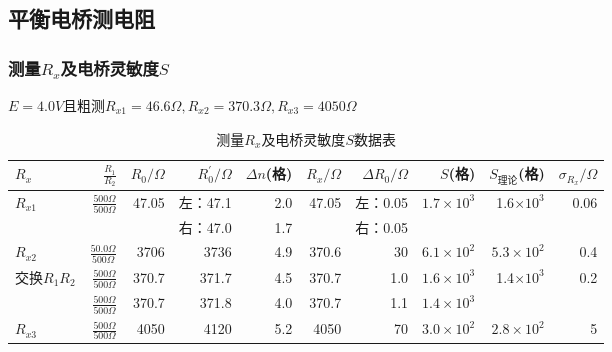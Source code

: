 \documentclass[a4 paper,12pt]{article}
\begin{document}
\subsection{平衡电桥测电阻}
\subsubsection{测量$R_{x}$及电桥灵敏度$S$}
\begin{center}
	$E=4.0V$且粗测$R_{x1}=46.6\Omega,R_{x2}=370.3\Omega,R_{x3}=4050\Omega$
\end{center}
\begin{table}[H]
	\centering
	\caption{测量$R_{x}$及电桥灵敏度$S$数据表}
	\begin{tabular}{|l|r|r|r|r|r|r|r|r|r|}
		\hline
		$R_{x} $   & $\frac{R_{1}}{R_{2}}$ & $R_{0}/\Omega$ &    $R_{0}^{\prime}/\Omega$   &$\Delta n$(格)       & $R_{x}/\Omega$      & $\Delta R_{0}/\Omega$      &  $S$(格)     &$S_{\text{理论}}$(格)& $\sigma_{R_{x}}/\Omega$ \\
		\hline \multirow{2}{*}{$R_{x1}$}&\multirow{2}{*}{$\frac{500\Omega}{500\Omega}$}&\multirow{2}{*}{47.05}&左：47.1&2.0&\multirow{2}{*}{47.05}&左：0.05&\multirow{2}{*}{$1.7\times10^{3}$}&\multirow{2}{*}{1.6$\times10^{3}$} &\multirow{2}{*}{0.06}\\
		&&&右：47.0&1.7&&右：0.05&&&\\
		\hline
		$R_{x2}$   &  $\frac{50.0\Omega}{500\Omega}$     & 3706  & 3736  & 4.9   & 370.6 & 30    & $6.1\times10^{2}$ &$5.3\times10^{2}$ &0.4 \\
		\hline
		\multirow{2}{*}{交换$R_{1}R_{2}$}  &   $\frac{500\Omega}{500\Omega}$    & 370.7 & 371.7 & 4.5   & 370.7 & 1.0     & $1.6\times10^{3}$ & \multirow{2}{*}{1.4$\times10^{3}$}& \multirow{2}{*}{0.2}\\
		 \cline{2-8} &  $\frac{500\Omega}{500\Omega}$     & 370.7 & 371.8 & 4.0  & 370.7 & 1.1   & $1.4\times10^{3}$ &&  \\
		  \hline
	 $R_{x3}$   &  $\frac{500\Omega}{500\Omega}$     & 4050  & 4120  & 5.2   & 4050  & 70    &  $3.0\times10^{2}$     &$2.8\times10^{2}$& 5 \\
	 \hline
	\end{tabular}
\end{table}
\end{document}
